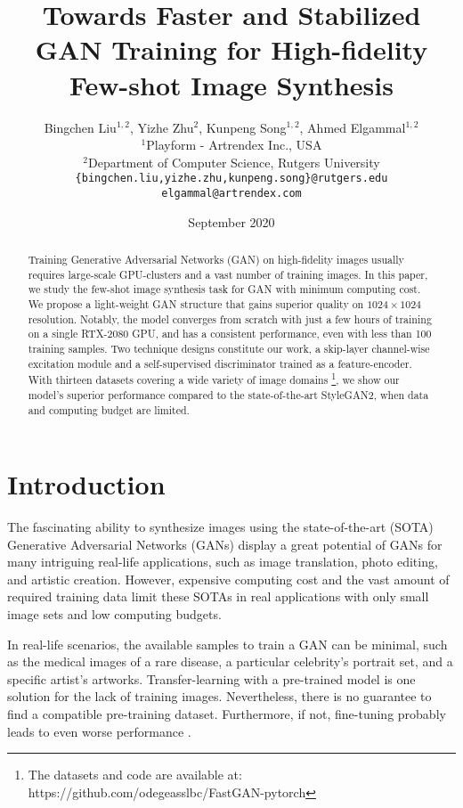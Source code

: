 \documentclass{article} \usepackage{iclr2021_conference,times}
\title{Towards Faster and Stabilized GAN Training for High-fidelity Few-shot Image Synthesis}
\author{Bingchen Liu$^{1,2}$, Yizhe Zhu$^2$, Kunpeng Song$^{1,2}$, Ahmed Elgammal$^{1,2}$\\
$^1$Playform - Artrendex Inc., USA \\
$^2$Department of Computer Science, Rutgers University\\
\texttt{\{bingchen.liu,yizhe.zhu,kunpeng.song\}@rutgers.edu} \\
\texttt{elgammal@artrendex.com}
}
\date{September 2020}
\begin{document}
\maketitle

\begin{abstract}
Training Generative Adversarial Networks (GAN) on high-fidelity images usually requires large-scale GPU-clusters and a vast number of training images. In this paper, we study the few-shot image synthesis task for GAN with minimum computing cost. We propose a light-weight GAN structure that gains superior quality on $1024\times1024$ resolution. Notably, the model converges from scratch with just a few hours of training on a single RTX-2080 GPU, and has a consistent performance, even with less than 100 training samples. Two technique designs constitute our work, a skip-layer channel-wise excitation module and a self-supervised discriminator trained as a feature-encoder. With thirteen datasets covering a wide variety of image domains \footnote{The datasets and code are available at: https://github.com/odegeasslbc/FastGAN-pytorch}, we show our model's superior performance compared to the state-of-the-art StyleGAN2, when data and computing budget are limited.
\end{abstract}


\section{Introduction}

The fascinating ability to synthesize images using the state-of-the-art (SOTA) Generative Adversarial Networks (GANs) \citep{goodfellow2014generative} display a great potential of GANs for many intriguing real-life applications, such as image translation, photo editing, and artistic creation. However, expensive computing cost and the vast amount of required training data limit these SOTAs in real applications with only small image sets and low computing budgets.

In real-life scenarios, the available samples to train a GAN can be minimal, such as the medical images of a rare disease, a particular celebrity's portrait set, and a specific artist's artworks. Transfer-learning with a pre-trained model \citep{mo2020freeze,wang2020minegan} is one solution for the lack of training images. Nevertheless, there is no guarantee to find a compatible pre-training dataset. Furthermore, if not, fine-tuning probably leads to even worse performance \citep{zhao2020differentiable}. 
\end{document}
